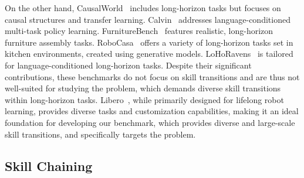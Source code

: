 On the other hand, CausalWorld~\cite{ahmed2020causalworld} includes long-horizon tasks but focuses on causal structures and transfer learning. Calvin~\cite{mees2022calvin} addresses language-conditioned multi-task policy learning. FurnitureBench~\cite{heo2023furniturebench} features realistic, long-horizon furniture assembly tasks. RoboCasa~\cite{nasiriany2024robocasa} offers a variety of long-horizon tasks set in kitchen environments, created using generative models. LoHoRavens~\cite{zhang2023lohoravens} is tailored for language-conditioned long-horizon tasks. Despite their significant contributions, these benchmarks do not focus on skill transitions and are thus not well-suited for studying the \pb problem, which demands diverse skill transitions within long-horizon tasks.
Libero~\cite{liu2024libero}, while primarily designed for lifelong robot learning, provides diverse tasks and customization capabilities, making it an ideal foundation for developing our \bm benchmark, which provides diverse and large-scale skill transitions, and specifically targets the \pb problem.


\subsection{Skill Chaining}


